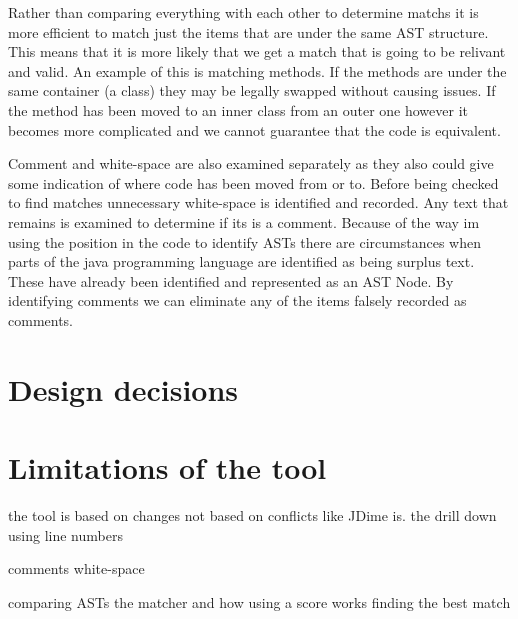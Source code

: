Rather than comparing everything with each other to determine matchs it is more efficient to match just the items that are under the same AST structure.  This means that it is more likely that we get a match that is going to be relivant and valid.  An example of this is matching methods. If the methods are under the same container (a class) they may be legally swapped without causing issues.  If the method has been moved to an inner class from an outer one however it becomes more complicated and we cannot guarantee that the code is equivalent.     

Comment and white-space are also examined separately as they also could give some indication of where code has been moved from or to.
Before being checked to find matches unnecessary white-space is identified and recorded.
Any text that remains is examined to determine if its is a comment.  Because of the way im using the position in the code to identify ASTs there are circumstances when parts of the java programming language are identified as being surplus text. These have already been identified and represented as an AST Node. By identifying comments we can eliminate any of the items falsely recorded as comments.



% 

\section{Design decisions}

\section{Limitations of the tool}

the tool is based on changes not based on conflicts like JDime is.
the drill down using line numbers


comments
white-space

comparing ASTs
the matcher and how using a score works
finding the best match

